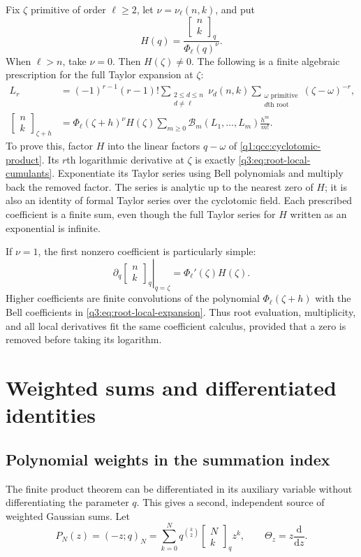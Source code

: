 \documentclass[11pt,a4paper,oneside,openany]{book}
\theoremstyle{definition}
\theoremstyle{remark}
\newcommand{\GB}[3][q]{\begin{bmatrix}#2\\#3\end{bmatrix}_{#1}}
\newcommand{\G}[2]{\GB{#1}{#2}}
\newcommand{\Gb}[3]{\GB[#3]{#1}{#2}}
\newcommand{\Yc}{\mathcal B}
\begin{document}
Fix $\zeta$ primitive of order $\ell\ge2$, let
$\nu=\nu_\ell(n,k)$, and put
\[
 H(q)=\frac{\G nk}{\Phi_\ell(q)^\nu}.
\]
When $\ell>n$, take $\nu=0$. Then $H(\zeta)\ne0$. The following is a
finite algebraic prescription for the full Taylor expansion at $\zeta$:
\begin{align}
 L_r&=(-1)^{r-1}(r-1)!
      \sum_{\substack{2\le d\le n\\d\ne\ell}}\nu_d(n,k)
      \sum_{\substack{\omega\text{ primitive}\\d\text{th root}}}
                         (\zeta-\omega)^{-r},
 \label{q3:eq:root-local-cumulants}\\
 \Gb nk{\zeta+h}
   &=\Phi_\ell(\zeta+h)^\nu H(\zeta)
        \sum_{m\ge0}\Yc_m(L_1,\ldots,L_m)\frac{h^m}{m!}.
 \label{q3:eq:root-local-expansion}
\end{align}
To prove this, factor $H$ into the linear factors $q-\omega$ of
\cref{q1:qcc:cyclotomic-product}. Its $r$th logarithmic derivative at
$\zeta$ is exactly \cref{q3:eq:root-local-cumulants}. Exponentiate its
Taylor series using Bell polynomials and multiply back the removed
factor. The series is analytic up to the nearest zero of $H$; it is
also an identity of formal Taylor series over the cyclotomic field.
Each prescribed coefficient is a finite sum, even though the full
Taylor series for $H$ written as an exponential is infinite.

If $\nu=1$, the first nonzero coefficient is particularly simple:
\begin{equation}
 \left.\partial_q\G nk\right|_{q=\zeta}
       =\Phi_\ell'(\zeta)H(\zeta).
 \label{q3:eq:root-simple-derivative}
\end{equation}
Higher coefficients are finite convolutions of the polynomial
$\Phi_\ell(\zeta+h)$ with the Bell coefficients in
\cref{q3:eq:root-local-expansion}. Thus root evaluation, multiplicity,
and all local derivatives fit the same coefficient calculus, provided
that a zero is removed before taking its logarithm.
\chapter{Weighted sums and differentiated identities}
\label{q1:qcc:weighted-sums}
\section{Polynomial weights in the summation index}
The finite product theorem can be differentiated in its auxiliary variable
without differentiating the parameter \(q\). This gives a second, independent
source of weighted Gaussian sums. Let
\[
 P_N(z)=(-z;q)_N
   =\sum_{k=0}^{N}q^{\binom k2}\GB Nk z^k,
 \qquad \Theta_z=z\frac{\mathrm d}{\mathrm dz}.
\]
\end{document}
